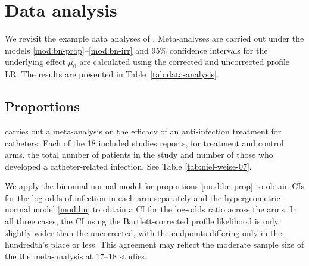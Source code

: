 \documentclass[12pt]{article}
\newcommand{\munull}{\mu_0}
\newcommand{\comment}[2][red]{%
 \iftoggle{commenttoggle}{%
  {\normalsize{\color{#1}{#2}}\normalsize}%
 }{%
 }%
}
\begin{document}
\section{Data analysis}
\label{sec:data-analysis}
We revisit the example data analyses of \citet{stijnen:10}. Meta-analyses
are carried out under the models \eqref{mod:bn-prop}--\eqref{mod:bn-irr} and 95\% confidence intervals
for the underlying effect $\munull$ are calculated using the corrected
and uncorrected profile LR. The results are presented in Table~\ref{tab:data-analysis}.

\subsection{Proportions}
\citet{niel:07} carries out a meta-analysis on the efficacy of an
anti-infection treatment for catheters. Each of the 18 included
studies reports, for treatment and control arms, the total number of
patients in the study and number of those who developed a
catheter-related infection. See Table \ref{tab:niel-weise-07}.%

We apply the binomial-normal model for proportions \eqref{mod:bn-prop} to obtain CIs for the log
odds of infection in each arm separately and the hypergeometric-normal model \eqref{mod:hn}
to obtain a CI for the log-odds ratio across the arms. In all three
cases, the CI using the Bartlett-corrected profile likelihood is only
slightly wider than the uncorrected, with the endpoints differing only
in the hundredth's place or less. This agreement may reflect the
moderate sample size of the the meta-analysis at 17--18 studies.
\end{document}
